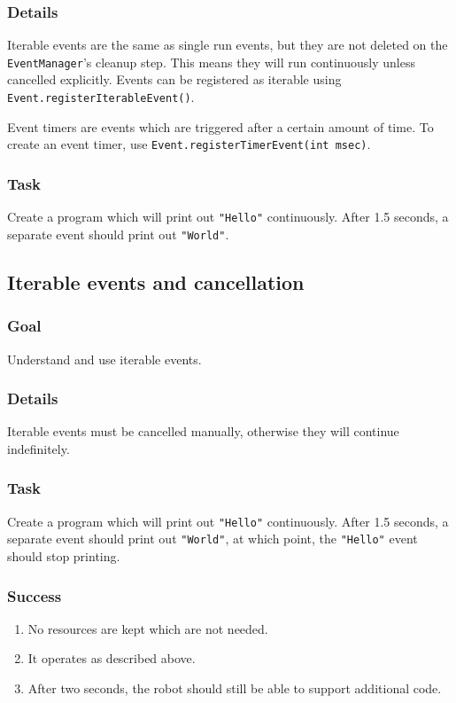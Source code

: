 \documentclass[a4paper]{article}
\begin{document}
\subsubsection{Details} Iterable events are the same as single run events, but they are not deleted on the \lstinline{EventManager}'s cleanup step. This means they will run continuously unless cancelled explicitly. Events can be registered as iterable using \lstinline{Event.registerIterableEvent()}. 

Event timers are events which are triggered after a certain amount of time. To create an event timer, use \lstinline{Event.registerTimerEvent(int msec)}.
\subsubsection{Task} Create a program which will print out \lstinline{"Hello"} continuously. After 1.5 seconds, a separate event should print out \lstinline{"World"}. 

\pagebreak\subsection{Iterable events and cancellation}
\subsubsection{Goal} Understand and use iterable events.
\subsubsection{Details} Iterable events must be cancelled manually, otherwise they will continue indefinitely.
\subsubsection{Task} Create a program which will print out \lstinline{"Hello"} continuously. After 1.5 seconds, a separate event should print out \lstinline{"World"}, at which point, the \lstinline{"Hello"} event should stop printing. 
\subsubsection{Success} \begin{enumerate}\item{No resources are kept which are not needed.}\item{It operates as described above.}\item{After two seconds, the robot should still be able to support additional code.}\end{enumerate}
\end{document}

